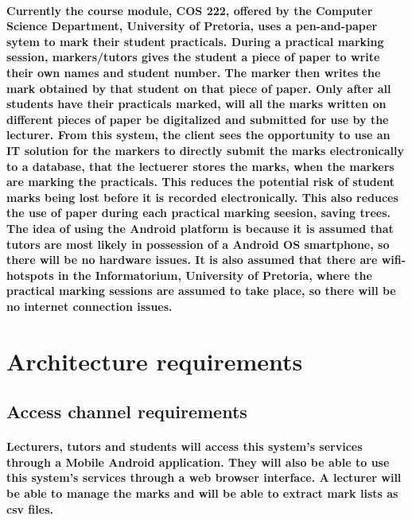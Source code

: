 \documentclass[12pt]{article}
\begin{document}
  \paragraph*{Currently the course module, COS 222, offered by the Computer Science Department, University of Pretoria, uses a pen-and-paper sytem to mark their student practicals. During a practical marking session, markers/tutors gives the student a piece of paper to write their own names and student number. The marker then writes the mark obtained by that student on that piece of paper. Only after all students have their practicals marked, will all the marks written on different pieces of paper be digitalized and submitted for use by the lecturer. From this system, the client sees the opportunity to use an IT solution for the markers to directly submit the marks electronically to a database, that the lectuerer stores the marks, when the markers are marking the practicals. This reduces the potential risk of student marks being lost before it is recorded electronically. This also reduces the use of paper during each practical marking seesion, saving trees. The idea of using the Android platform is because it is assumed that tutors are most likely in possession of a Android OS smartphone, so there will be no hardware issues. It is also assumed that there are wifi-hotspots in the Informatorium, University of Pretoria, where the practical marking sessions are assumed to take place, so there will be no internet connection issues.}
  \section{Architecture requirements}
  \subsection{Access channel requirements}
  \paragraph*{Lecturers, tutors and students will access this system's services through a Mobile Android application. They will also be able to use this system's services through a web browser interface. A lecturer will be able to manage the marks and will be able to extract mark lists as csv files.}
\end{document}

